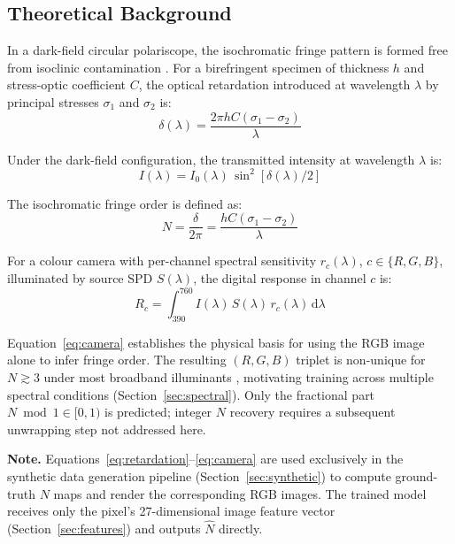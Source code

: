 \documentclass[review,12pt]{elsarticle}
\begin{document}
\subsection{Theoretical Background}
\label{sec:theory}

In a dark-field circular polariscope, the isochromatic fringe pattern is
formed free from isoclinic contamination \cite{dally1991,ramesh2000}. For
a birefringent specimen of thickness $h$ and stress-optic coefficient $C$,
the optical retardation introduced at wavelength $\lambda$ by principal
stresses $\sigma_1$ and $\sigma_2$ is:
\begin{equation}
  \delta(\lambda) = \frac{2\pi h C (\sigma_1 - \sigma_2)}{\lambda}
  \label{eq:retardation}
\end{equation}

Under the dark-field configuration, the transmitted intensity at wavelength
$\lambda$ is:
\begin{equation}
  I(\lambda) = I_0(\lambda)\,\sin^2\!\left[\delta(\lambda)/2\right]
  \label{eq:intensity}
\end{equation}

The isochromatic fringe order is defined as:
\begin{equation}
  N = \frac{\delta}{2\pi} = \frac{h C (\sigma_1 - \sigma_2)}{\lambda}
  \label{eq:fringeorder}
\end{equation}

For a colour camera with per-channel spectral sensitivity $r_c(\lambda)$,
$c \in \{R,G,B\}$, illuminated by source SPD $S(\lambda)$, the digital
response in channel $c$ is:
\begin{equation}
  R_c = \int_{390}^{760} I(\lambda)\,S(\lambda)\,r_c(\lambda)\,\mathrm{d}\lambda
  \label{eq:camera}
\end{equation}

Equation~\eqref{eq:camera} establishes the physical basis for using the RGB
image alone to infer fringe order. The resulting $(R,G,B)$ triplet is
non-unique for $N \gtrsim 3$ under most broadband illuminants
\cite{ajovalasit2015}, motivating training across multiple spectral
conditions (Section~\ref{sec:spectral}). Only the fractional part
$N \bmod 1 \in [0,1)$ is predicted; integer $N$ recovery requires a
subsequent unwrapping step not addressed here.

\textbf{Note.} Equations~\eqref{eq:retardation}--\eqref{eq:camera}
are used exclusively in the synthetic data generation pipeline
(Section~\ref{sec:synthetic}) to compute ground-truth $N$ maps and render
the corresponding RGB images. The trained model receives only the pixel's
27-dimensional image feature vector (Section~\ref{sec:features}) and
outputs $\hat{N}$ directly.
\end{document}
